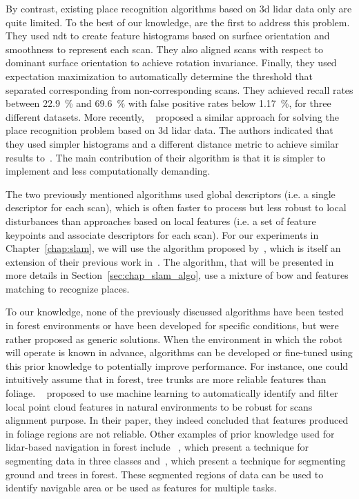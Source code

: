 By contrast, existing place recognition algorithms based on \gls*{3d} \gls*{lidar} data only are quite limited. To the best of our knowledge, \citet{Magnusson2009} are the first to address this problem. They used \gls*{ndt} to create feature histograms based on surface orientation and smoothness to represent each scan. They also aligned scans with respect to dominant surface orientation to achieve rotation invariance. Finally, they used expectation maximization to automatically determine the threshold that separated corresponding from non-corresponding scans. They achieved recall rates between \SI{22.9}{\percent} and \SI{69.6}{\percent} with false positive rates below \SI{1.17}{\percent}, for three different datasets. More recently, ~\citet{Mack2015} proposed a similar approach for solving the place recognition problem based on \gls*{3d} lidar data. The authors indicated that they used simpler histograms and a different distance metric to achieve similar results to~\citet{Magnusson2009}. The main contribution of their algorithm is that it is simpler to implement and less computationally demanding.

The two previously mentioned algorithms used global descriptors (i.e. a single descriptor for each scan), which is often faster to process but less robust to local disturbances than approaches based on local features (i.e. a set of feature keypoints and associate descriptors for each scan). For our experiments in Chapter~\ref{chap:slam}, we will use the algorithm proposed by~\citet{Steder2011b}, which is itself an extension of their previous work in~\citep{Steder2010}. The algorithm, that will be presented in more details in Section~\ref{sec:chap_slam_algo}, use a mixture of \gls*{bow} and features matching to recognize places.


To our knowledge, none of the previously discussed algorithms have been tested in forest environments or have been developed for specific conditions, but were rather proposed as generic solutions. When the environment in which the robot will operate is known in advance, algorithms can be developed or fine-tuned using this prior knowledge to potentially improve performance. For instance, one could intuitively assume that in forest, tree trunks are more reliable features than foliage. ~\citet{Latulippe2013} proposed to use machine learning to automatically identify and filter local point cloud features in natural environments to be robust for scans alignment purpose. In their paper, they indeed concluded that features produced in foliage regions are not reliable. Other examples of prior knowledge used for \gls*{lidar}-based navigation in forest include ~\citep{Lalonde2006}, which present a technique for segmenting data in three classes and~\citep{Mcdaniel2012}, which present a technique for segmenting ground and trees in forest. These segmented regions of data can be used to identify navigable area or be used as features for multiple tasks.

